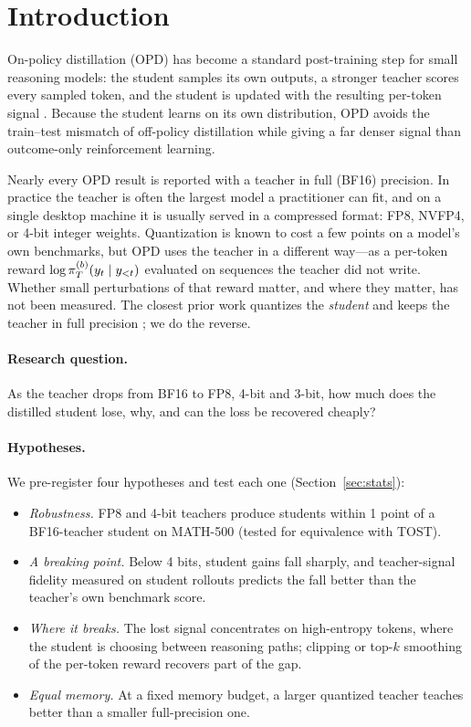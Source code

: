 \section{Introduction}\label{sec:intro}

On-policy distillation (OPD) has become a standard post-training step for small reasoning
models: the student samples its own outputs, a stronger teacher scores every sampled token,
and the student is updated with the resulting per-token signal
\citep{agarwal2024gkd,thinkingmachines2025opd,opdsurvey2026}. Because the student learns on
its own distribution, OPD avoids the train--test mismatch of off-policy distillation while
giving a far denser signal than outcome-only reinforcement learning.

Nearly every OPD result is reported with a teacher in full (BF16) precision. In practice the
teacher is often the largest model a practitioner can fit, and on a single desktop machine it
is usually served in a compressed format: FP8, NVFP4, or 4-bit integer weights. Quantization
is known to cost a few points on a model's own benchmarks, but OPD uses the teacher in a
different way---as a per-token reward $\log\pi_T^{(b)}(y_t\mid y_{<t})$ evaluated on sequences the
teacher did not write. Whether small perturbations of that reward matter, and where they
matter, has not been measured. The closest prior work quantizes the \emph{student} and keeps
the teacher in full precision \citep{quantstudent2026}; we do the reverse.

\paragraph{Research question.} As the teacher drops from BF16 to FP8, 4-bit and 3-bit, how
much does the distilled student lose, why, and can the loss be recovered cheaply?

\paragraph{Hypotheses.} We pre-register four hypotheses and test each one
(Section~\ref{sec:stats}):
\begin{itemize}
  \item[\textbf{H1}] \emph{Robustness.} FP8 and 4-bit teachers produce students within 1 point
        of a BF16-teacher student on MATH-500 (tested for equivalence with TOST).
  \item[\textbf{H2}] \emph{A breaking point.} Below 4 bits, student gains fall sharply, and
        teacher-signal fidelity measured on student rollouts predicts the fall better than the
        teacher's own benchmark score.
  \item[\textbf{H3}] \emph{Where it breaks.} The lost signal concentrates on high-entropy
        tokens, where the student is choosing between reasoning paths; clipping or top-$k$
        smoothing of the per-token reward recovers part of the gap.
  \item[\textbf{H4}] \emph{Equal memory.} At a fixed memory budget, a larger quantized teacher
        teaches better than a smaller full-precision one.
\end{itemize}

